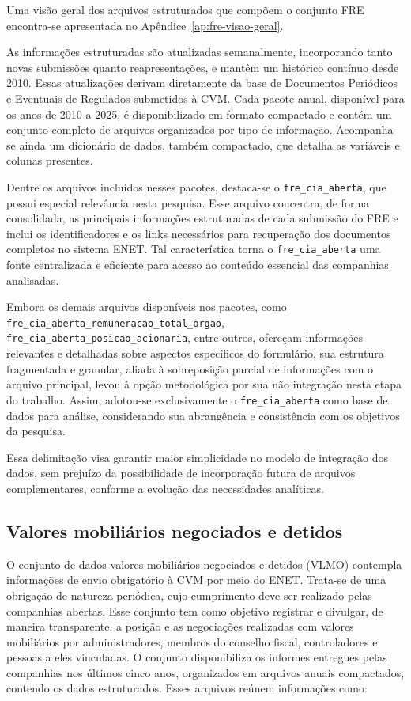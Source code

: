 Uma visão geral dos arquivos estruturados que compõem o conjunto FRE encontra-se apresentada no Apêndice~\ref{ap:fre-visao-geral}.

As informações estruturadas são atualizadas semanalmente, incorporando tanto novas submissões quanto reapresentações, e mantêm um histórico contínuo desde 2010. Essas atualizações derivam diretamente da base de Documentos Periódicos e Eventuais de Regulados submetidos à CVM. Cada pacote anual, disponível para os anos de 2010 a 2025, é disponibilizado em formato compactado e contém um conjunto completo de arquivos organizados por tipo de informação. Acompanha-se ainda um dicionário de dados, também compactado, que detalha as variáveis e colunas presentes.

Dentre os arquivos incluídos nesses pacotes, destaca-se o \texttt{fre\_cia\_aberta}, que possui especial relevância nesta pesquisa. Esse arquivo concentra, de forma consolidada, as principais informações estruturadas de cada submissão do FRE e inclui os identificadores e os links necessários para recuperação dos documentos completos no sistema ENET. Tal característica torna o \texttt{fre\_cia\_aberta} uma fonte centralizada e eficiente para acesso ao conteúdo essencial das companhias analisadas.

Embora os demais arquivos disponíveis nos pacotes, como \texttt{fre\_cia\_aberta\_remuneracao\_total\_orgao}, \texttt{fre\_cia\_aberta\_posicao\_acionaria}, entre outros, ofereçam informações relevantes e detalhadas sobre aspectos específicos do formulário, sua estrutura fragmentada e granular, aliada à sobreposição parcial de informações com o arquivo principal, levou à opção metodológica por sua não integração nesta etapa do trabalho. Assim, adotou-se exclusivamente o \texttt{fre\_cia\_aberta} como base de dados para análise, considerando sua abrangência e consistência com os objetivos da pesquisa.

Essa delimitação visa garantir maior simplicidade no modelo de integração dos dados, sem prejuízo da possibilidade de incorporação futura de arquivos complementares, conforme a evolução das necessidades analíticas.


\subsection{Valores mobiliários negociados e detidos}
O conjunto de dados valores mobiliários negociados e detidos (VLMO) contempla informações de envio obrigatório à CVM por meio do ENET. Trata-se de uma obrigação de natureza periódica, cujo cumprimento deve ser realizado pelas companhias abertas. Esse conjunto tem como objetivo registrar e divulgar, de maneira transparente, a posição e as negociações realizadas com valores mobiliários por administradores, membros do conselho fiscal, controladores e pessoas a eles vinculadas. O conjunto disponibiliza os informes entregues pelas companhias nos últimos cinco anos, organizados em arquivos anuais compactados, contendo os dados estruturados. Esses arquivos reúnem informações como:

